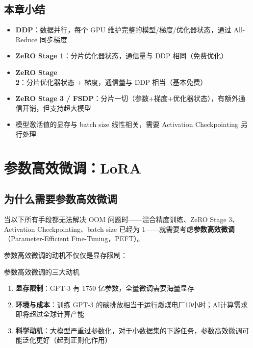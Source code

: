 \documentclass[a4paper]{article}
\begin{document}
\subsection{本章小结}

\begin{itemize}
    \item \textbf{DDP}：数据并行，每个 GPU 维护完整的模型/梯度/优化器状态，通过 All-Reduce 同步梯度
    \item \textbf{ZeRO Stage 1}：分片优化器状态，通信量与 DDP 相同（免费优化）
    \item \textbf{ZeRO Stage 2}：分片优化器状态 + 梯度，通信量与 DDP 相当（基本免费）
    \item \textbf{ZeRO Stage 3 / FSDP}：分片一切（参数+梯度+优化器状态），有额外通信开销，但支持超大模型
    \item 模型激活值的显存与 batch size 线性相关，需要 Activation Checkpointing 另行处理
\end{itemize}


\section{参数高效微调：LoRA}

\subsection{为什么需要参数高效微调}

当以下所有手段都无法解决 OOM 问题时——混合精度训练、ZeRO Stage 3、Activation Checkpointing、batch size 已经为 1——就需要考虑\textbf{参数高效微调}（Parameter-Efficient Fine-Tuning，PEFT）。





参数高效微调的动机不仅仅是显存限制：





\begin{knowledgebox}{参数高效微调的三大动机}
\begin{enumerate}
    \item \textbf{显存限制}：GPT-3 有 1750 亿参数，全量微调需要海量显存
    \item \textbf{环境与成本}：训练 GPT-3 的碳排放相当于运行燃煤电厂10小时；AI计算需求即将超过全球计算产能
    \item \textbf{科学动机}：大模型严重过参数化，对于小数据集的下游任务，参数高效微调可能泛化更好（起到正则化作用）
\end{enumerate}
\end{knowledgebox}
\end{document}
